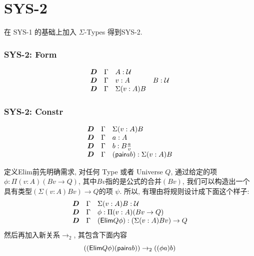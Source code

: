 







\section{SYS-2}

在 SYS-1 的基础上加入 $\Sigma$-Types 得到SYS-2.



\subsubsection*{SYS-2: Form}

\[
  \begin{array}{llll}
    \boldsymbol{D} & \Gamma & A : \mathcal{U}   &
    \\ 
    \boldsymbol{D} & \Gamma & v : A  & B : \mathcal{U} 
    \\
    \boldsymbol{D} & \Gamma & \Sigma (v : A) B
  \end{array}
\]




\subsubsection*{SYS-2: Constr}

\[
  \begin{array}{lll}
    \boldsymbol{D} & \Gamma & \Sigma (v : A) B
    \\ 
    \boldsymbol{D} & \Gamma & a : A  
    \\
    \boldsymbol{D} & \Gamma & b : B\frac{a}{v}
    \\
    \boldsymbol{D} & \Gamma & (\text{{\sffamily pair}} a b) : \Sigma (v : A) B
  \end{array}
\]


定义Elim前先明确需求, 对任何 Type 或者 Universe $Q$, 通过给定的项$\phi: \Pi(v : A)(B v \rightarrow Q)$, 其中$B v$指的是公式的合并$(B v)$, 我们可以构造出一个具有类型$(\Sigma (v : A) Bv) \rightarrow Q$的项 $\psi$. 所以, 有理由将规则设计成下面这个样子:
\[
  \begin{array}{lll}
    \boldsymbol{D} & \Gamma & \Sigma (v : A) B : \mathcal{U} 
    \\ 
    \boldsymbol{D} & \Gamma & \phi : \Pi (v : A) (Bv \rightarrow Q)
    \\
    \boldsymbol{D} & \Gamma & (\text{{\sffamily Elim}} Q \phi) :  (\Sigma (v : A) Bv) \rightarrow Q
  \end{array}
\]
然后再加入新关系$\rightarrow_2$, 其包含下面内容
\[
  ((\text{{\sffamily Elim}} Q \phi) (\text{{\sffamily pair}} a b )) \rightarrow_2 ((\phi a) b)
\]


